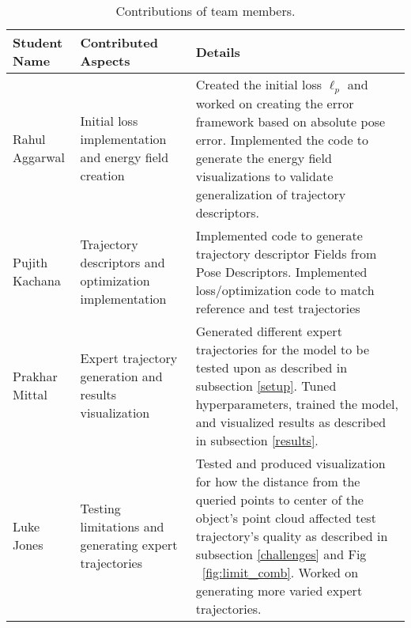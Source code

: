 \documentclass[10pt,twocolumn,letterpaper]{article}
\begin{document}
\begin{table*}
\begin{center}
\begin{tabular}{|l|l|p{7cm}|}
\hline
Student Name & Contributed Aspects & Details \\
\hline\hline
Rahul Aggarwal & Initial loss implementation and energy field creation & Created the initial loss $\ell_p$ and worked on creating the error framework based on absolute pose error. Implemented the code to generate the energy field visualizations to validate generalization of trajectory descriptors. \\
Pujith Kachana & Trajectory descriptors and optimization implementation & Implemented code to generate trajectory descriptor Fields from Pose Descriptors. Implemented loss/optimization code to match reference and test trajectories\\
Prakhar Mittal & Expert trajectory generation and results visualization & Generated different expert trajectories for the model to be tested upon as described in subsection \ref{setup}. Tuned hyperparameters, trained the model, and visualized results as described in subsection \ref{results}. \\
Luke Jones & Testing limitations and generating expert trajectories & Tested and produced visualization for how the distance from the queried points to center of the object's point cloud affected test trajectory's quality as described in subsection \ref{challenges} and Fig ~\ref{fig:limit_comb}. Worked on generating more varied expert trajectories.\\
\hline
\end{tabular}
\end{center}
\caption{Contributions of team members.}
\label{tab:contributions}
\end{table*}


\newpage
\newpage

{\small


}
\end{document}
